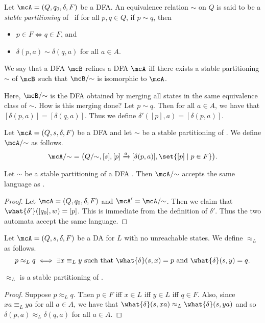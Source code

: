 \begin{definition*} \label{def:stable_partitioning}
    Let $\mcA = (Q, q_0, \delta, F)$ be a DFA.
    An equivalence relation $\sim$ on $Q$ is said to be a
    \emph{stable partitioning} of \mcA\ if for all $p, q \in Q$,
    if $p \sim q$, then
    \begin{itemize}
        \item $p \in F \iff q \in F$, and
        \item $\delta(p, a) \sim \delta(q, a)$ for all $a \in A$.
    \end{itemize}
\end{definition*}
\begin{definition*} \label{def:dfa_refinement}
    We say that a DFA $\mcB$ refines a DFA $\mcA$ iff there exists a stable
    partitioning $\sim$ of $\mcB$ such that $\mcB/{\sim}$ is isomorphic to
    $\mcA$.
\end{definition*}
Here, $\mcB/{\sim}$ is the DFA obtained by merging all states in the same
equivalence class of $\sim$.
How is this merging done?
Let $p \sim q$.
Then for all $a \in A$, we have that $[\delta(p, a)] = [\delta(q, a)]$.
Thus we define $\delta'([p], a) = [\delta(p, a)]$.
\begin{definition*}
    Let $\mcA = (Q, s, \delta, F)$ be a DFA and let $\sim$ be a stable
    partitioning of \mcA.
    We define $\mcA/{\sim}$ as follows. \[
        \mcA/{\sim} = \big(
            Q/{\sim},
            [s],
            [p] \xrightarrow{a} [\delta(p, a)],
            \set{[p] \mid p \in F}
        \big).
    \]
\end{definition*}

\begin{proposition}
    Let $\sim$ be a stable partitioning of a DFA \mcA.
    Then $\mcA/{\sim}$ accepts the same language as \mcA.
\end{proposition}
\begin{proof}
    Let $\mcA = (Q, q_0, \delta, F)$ and $\mcA' = \mcA/{\sim}$.
    Then we claim that $\what{\delta'}([q_0], w) = [p]$.
    This is immediate from the definition of $\delta'$.
    Thus the two automata accept the same language.
\end{proof}

\begin{definition}
    Let $\mcA = (Q, s, \delta, F)$ be a DA for $L$ with no unreachable
    states.
    We define $\approx_L$ as follows. \[
        p \approx_L q \iff \exists x \equiv_L y \text{ such that }
            \what{\delta}(s, x) = p \text{ and } \what{\delta}(s, y) = q.
    \]
\end{definition}
\begin{proposition}
    $\approx_L$ is a stable partitioning of \mcA.
\end{proposition}
\begin{proof}
    Suppose $p \approx_L q$.
    Then $p \in F$ iff $x \in L$ iff $y \in L$ iff $q \in F$.
    Also, since $xa \equiv_L ya$ for all $a \in A$, we have that
    $\what{\delta}(s, xa) \approx_L \what{\delta}(s, ya)$ and so
    $\delta(p, a) \approx_L \delta(q, a)$ for all $a \in A$.
\end{proof}

